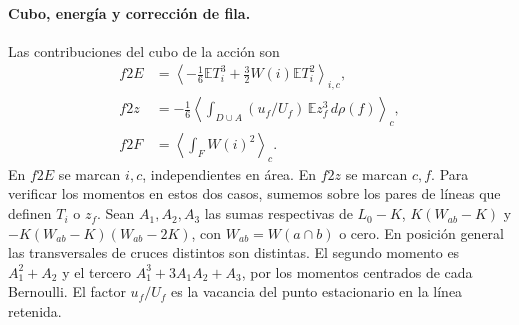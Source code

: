 \paragraph{Cubo, energía y corrección de fila.}
Las contribuciones del cubo de la acción son
\begin{align*}
 f2E&=\left\langle-\tfrac16\mathbb E T_i^3+\tfrac32 W(i)\mathbb E T_i^2\right\rangle_{i,c},\\
 f2z&=-\tfrac16\left\langle\int_{D\cup A}(u_f/U_f)\,\mathbb E z_f^3\,d\rho(f)\right\rangle_c,\\
 f2F&=\left\langle\int_F W(i)^2\right\rangle_c .
\end{align*}
En \(f2E\) se marcan \(i,c\), independientes en área. En \(f2z\) se marcan \(c,f\).
Para verificar los momentos en estos dos casos, sumemos sobre los pares de líneas que definen
\(T_i\) o \(z_f\). Sean \(A_1,A_2,A_3\) las sumas respectivas de \(L_0-K\),
\(K(W_{ab}-K)\) y \(-K(W_{ab}-K)(W_{ab}-2K)\), con \(W_{ab}=W(a\cap b)\) o cero.
En posición general las transversales de cruces distintos son distintas. El segundo momento es
\(A_1^2+A_2\) y el tercero \(A_1^3+3A_1A_2+A_3\), por los momentos centrados de cada Bernoulli.
El factor \(u_f/U_f\) es la vacancia del punto estacionario en la línea retenida.

